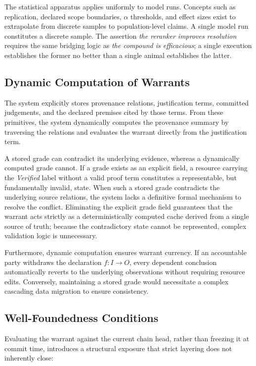 \documentclass[manuscript,nonacm=true]{acmart}
\begin{document}
The statistical apparatus applies uniformly to model runs. Concepts such as replication, declared scope boundaries, $\alpha$ thresholds, and effect sizes exist to extrapolate from discrete samples to population-level claims. A single model run constitutes a discrete sample. The assertion \emph{the reranker improves resolution} requires the same bridging logic as \emph{the compound is efficacious}; a single execution establishes the former no better than a single animal establishes the latter.

\subsection{Dynamic Computation of Warrants}

The system explicitly stores provenance relations, justification terms, committed judgements, and the declared premises cited by those terms. From these primitives, the system dynamically computes the provenance summary by traversing the relations and evaluates the warrant directly from the justification term.

A stored grade can contradict its underlying evidence, whereas a dynamically computed grade cannot. If a grade exists as an explicit field, a resource carrying the \emph{Verified} label without a valid proof term constitutes a representable, but fundamentally invalid, state. When such a stored grade contradicts the underlying source relations, the system lacks a definitive formal mechanism to resolve the conflict. Eliminating the explicit grade field guarantees that the warrant acts strictly as a deterministically computed cache derived from a single source of truth; because the contradictory state cannot be represented, complex validation logic is unnecessary.

Furthermore, dynamic computation ensures warrant currency. If an accountable party withdraws the declaration $f : I \to O$, every dependent conclusion automatically reverts to the underlying observations without requiring resource edits. Conversely, maintaining a stored grade would necessitate a complex cascading data migration to ensure consistency.

\subsection{Well-Foundedness Conditions}

Evaluating the warrant against the current chain head, rather than freezing it at commit time, introduces a structural exposure that strict layering does not inherently close:
\end{document}
